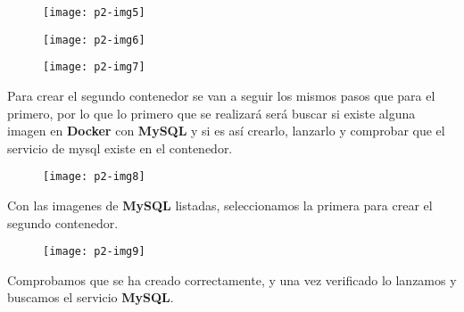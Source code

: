 \documentclass[10pt]{article}
\begin{document}
\begin{figure}[H]
	\begin{center}
 		\texttt{[image: p2-img5]}
	\end{center} 
\end{figure}

\begin{figure}[H]
	\begin{center}
 		\texttt{[image: p2-img6]}
	\end{center} 
\end{figure}

\begin{figure}[H]
	\begin{center}
 		\texttt{[image: p2-img7]}
	\end{center} 
\end{figure}

Para crear el segundo contenedor se van a seguir los mismos pasos que para el primero, por lo que lo primero que se realizará será buscar si existe alguna imagen en \textbf{Docker} con \textbf{MySQL} y si es así crearlo, lanzarlo y comprobar que el servicio de mysql existe en el contenedor.\\

\begin{figure}[H]
	\begin{center}
 		\texttt{[image: p2-img8]}
	\end{center} 
\end{figure}


Con las imagenes de \textbf{MySQL} listadas, seleccionamos la primera para crear el segundo contenedor.\\

\begin{figure}[H]
	\begin{center}
 		\texttt{[image: p2-img9]}
	\end{center} 
\end{figure}

Comprobamos que se ha creado correctamente, y una vez verificado lo lanzamos y buscamos el servicio \textbf{MySQL}.\\
\end{document}
